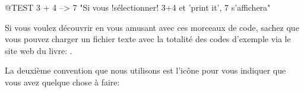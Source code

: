\documentclass[a4paper,10pt,twoside]{book}
\begin{document}
\begin{code}{@TEST}
3 + 4 --> 7    "Si vous !s\'electionner! 3+4 et 'print it', 7 s'affichera"
\end{code}

Si vous voulez d\'ecouvrir \sq en vous amusant avec ces morceaux de
code, sachez que vous pouvez charger un fichier texte avec la
totalit\'e des codes d'exemple via le site web du livre: \spe. 

La deuxi\`eme convention que nous utilisons est l'ic\^one
\dothisicon{} pour vous indiquer que vous avez quelque chose \`a faire: 









\end{document}
